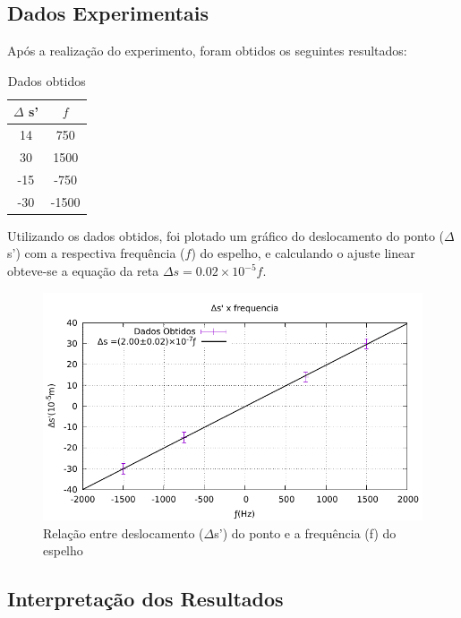 \subsection{Dados Experimentais}
Após a realização do experimento, foram obtidos os seguintes resultados:
\begin{table}[h!]
\centering

\begin{tabular}{|	c	|	c	|}
\hline
$\Delta$ s' & $f$   \\ \hline
14          & 750   \\ \hline
30          & 1500  \\ \hline
-15         & -750  \\ \hline
-30         & -1500 \\ \hline
\end{tabular}
\caption{Dados obtidos}
\end{table}

Utilizando os dados obtidos, foi plotado um gráfico do deslocamento do ponto ($\Delta$s') com a respectiva frequência ($f$) do espelho, e calculando o
ajuste linear obteve-se a equação da reta $\Delta s
=0.02\times10^{-5}f$.


\begin{figure}[!ht]
	\centering
		\includegraphics[scale= 1.1]{Graficusao/c.pdf}
	\caption{Relação entre deslocamento ($\Delta$s') do ponto e a frequência (f) do espelho }
\end{figure}

\subsection{Interpretação dos Resultados}

